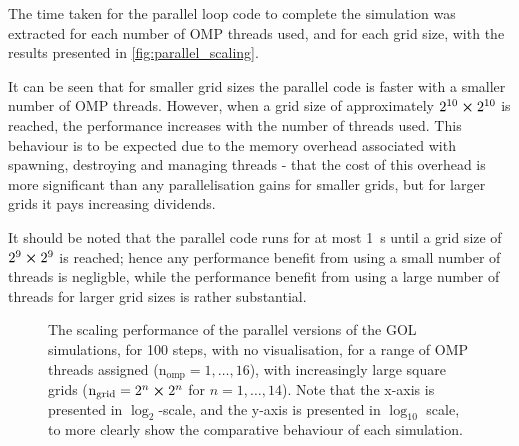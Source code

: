 \documentclass[]{article}
\begin{document}
The time taken for the parallel loop code to complete the simulation was
extracted for each number of OMP threads used, and for each grid size, with the
results presented in \autoref{fig:parallel_scaling}.

It can be seen that for smaller grid sizes the parallel code is faster with
a smaller number of OMP threads.
However, when a grid size of approximately $2^{10} \cross 2^{10}$ is reached,
the performance increases with the number of threads used.
This behaviour is to be expected due to the memory overhead associated with
spawning, destroying and managing threads - that the cost of this overhead is
more significant than any parallelisation gains for smaller grids, but for
larger grids it pays increasing dividends.

It should be noted that the parallel code runs for at most \SI{1}{\second} until
a grid size of $2^{9} \cross 2^{9}$ is reached; hence any performance benefit
from using a small number of threads is negligble, while the performance benefit
from using a large number of threads for larger grid sizes is rather
substantial.

\begin{figure}[h]
  \centering
  \caption{The scaling performance of the parallel versions of the GOL
    simulations, for 100 steps, with no visualisation, for a range of OMP
    threads assigned ($\mathrm{n_{omp}} = 1, \dotsc, 16$), with increasingly
    large square grids ($\mathrm{n_{grid}} = 2^{n}\cross 2^{n}$ for
    $n = 1, \dotsc, 14$).
    Note that the x-axis is presented in $\log_{2}$-scale, and the y-axis is
    presented in $\log_{10}$ scale, to more clearly show the comparative
    behaviour of each simulation.
  }
  \label{fig:parallel_scaling}
\end{figure}
\end{document}
